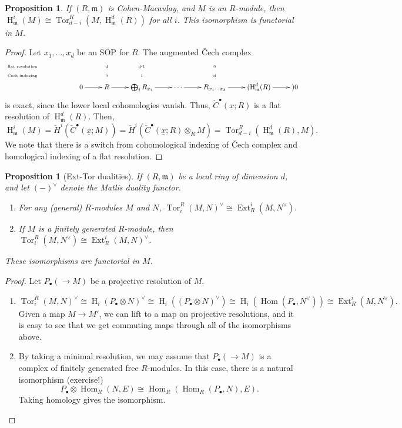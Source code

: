 \documentclass[11pt]{book}
\newtheorem{proposition}[theorem]{Proposition}
\numberwithin{equation}{section}
\numberwithin{theorem}{chapter}
\theoremstyle{definition}
\newtheorem*{basic properties}{Basic Properties}
\newtheorem*{Important Remark}{Important Remark}
\theoremstyle{remark}
\newcommand{\m}{\mathfrak{m}}
\newcommand{\Hom}{\operatorname{Hom}}
\newcommand{\Ext}{\operatorname{Ext}}
\newcommand{\Tor}{\operatorname{Tor}}
\renewcommand{\H}{\operatorname{H}}
\begin{document}
\begin{proposition}
	If $(R,\m)$ is Cohen-Macaulay, and $M$ is an $R$-module, then $\H^i_\m(M) \cong \Tor^R_{d-i}(M,\H^d_\m(R))$ for all $i$. This isomorphism is functorial in $M$.
\end{proposition}

\begin{proof} Let $x_1,\dots,x_d$ be an SOP for $R$. The augmented \v Cech complex
	$$\xymatrix@R=1mm{
	\textrm{\tiny{flat resolution}} && & \textrm{\tiny{d}} & \textrm{\tiny{d-1}} & & \textrm{\tiny{0}} \\
	\textrm{\tiny{\v{C}ech indexing}} && & \textrm{\tiny{0}} & \textrm{\tiny{1}} & & \textrm{\tiny{d}} \\
	&& 0 \ar[r] & R \ar[r] & \bigoplus_i R_{x_i} \ar[r] & \cdots \ar[r] & R_{x_1\cdots x_d} \ar[r] & ( \H^d_\m(R) \ar[r] & ) 0}$$
	is exact, since the lower local cohomologies vanish. Thus, $\check{C}^{\bullet}(\underline{x};R)$ is a flat resolution of $\H^d_{\m}(R)$. Then, \[\H^i_\m(M)=\check{H}^i(\check{C}^{\bullet}(\underline{x};M))=\check{H}^i(\check{C}^{\bullet}(\underline{x};R)\otimes_R M)=\Tor^R_{d-i}(\H^d_\m(R),M).\] We note that there is a switch from cohomological indexing of \v Cech complex and homological indexing of a flat resolution.
\end{proof}


\begin{proposition}[Ext-Tor dualities]
	If $(R,\m)$ be a local ring of dimension $d$, and let $(-)^{\vee}$ denote the Matlis duality functor.
	\begin{enumerate}[1)]
		\item For any (general) $R$-modules $M$ and $N$, $\Tor^R_i(M,N)^{\vee} \cong \Ext^i_R(M,N^{\vee})$.
		\item If $M$ is a finitely generated $R$-module, then $\Tor^R_i(M,N^{\vee}) \cong \Ext^i_R(M,N)^{\vee}$.
	\end{enumerate}
These isomorphisms are functorial in $M$.
\end{proposition}

\begin{proof}
Let $P_{\bullet} (\longrightarrow M)$ be a projective resolution of $M$.
\begin{enumerate}[1)]
		\item
		$$\Tor^R_i(M,N)^{\vee} \cong \H_i(P_{\bullet} \otimes N)^{\vee} \cong \H_i((P_{\bullet} \otimes N)^{\vee}) \cong \H_i(\Hom(P_{\bullet},N^{\vee})) \cong \Ext^i_R(M,N^{\vee}).$$
		Given a map $M \to M'$, we can lift to a map on projective resolutions, and it is easy to see that we get commuting maps through all of the isomorphisms above.
		\item By taking a minimal resolution, we may assume that $P_{\bullet} (\longrightarrow M)$ is a complex of finitely generated free $R$-modules. In this case, there is a natural isomorphism (exercise!)
		$$P_{\bullet} \otimes \Hom_R(N,E) \cong \Hom_R(\Hom_R(P_\bullet, N), E).$$
		Taking homology gives the isomorphism.
	\end{enumerate}
\end{proof}
\end{document}
